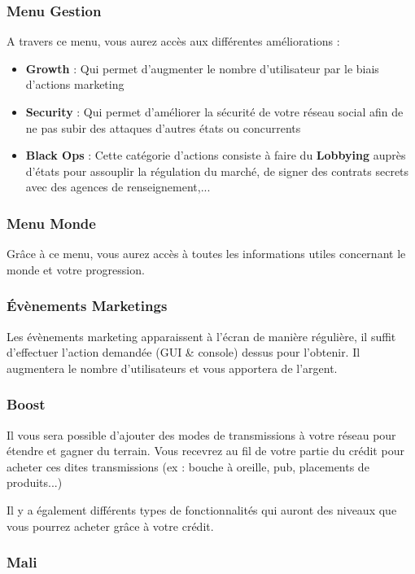 \subsubsection{Menu Gestion}
A travers ce menu, vous aurez accès aux différentes améliorations :
\begin{itemize}
            \item \textbf{Growth} : Qui permet d'augmenter le nombre d'utilisateur par le biais d'actions marketing
            \item \textbf{Security} : Qui permet d'améliorer la sécurité de votre réseau social afin de ne pas subir des attaques d'autres états ou concurrents
            \item \textbf{Black Ops} : Cette catégorie d'actions consiste à faire du \textbf{Lobbying} auprès d'états pour assouplir la régulation du marché, de signer des contrats secrets avec des agences de renseignement,...
        \end{itemize}

\subsubsection{Menu Monde}
Grâce à ce menu, vous aurez accès à toutes les informations utiles concernant le monde et votre progression.

\subsubsection{Évènements Marketings}
Les évènements marketing apparaissent à l'écran de manière régulière, il suffit d'effectuer l'action demandée (GUI \& console) dessus pour l'obtenir. Il augmentera le nombre d'utilisateurs et vous apportera de l'argent.

\subsubsection{Boost}

Il vous sera possible d'ajouter des modes de transmissions à votre réseau pour étendre et gagner du terrain. Vous recevrez au fil de votre partie du crédit pour acheter ces dites transmissions (ex : bouche à oreille, pub, placements de produits...)

Il y a également différents types de fonctionnalités qui auront des niveaux que vous pourrez acheter grâce à votre crédit.

\subsubsection{Mali}

